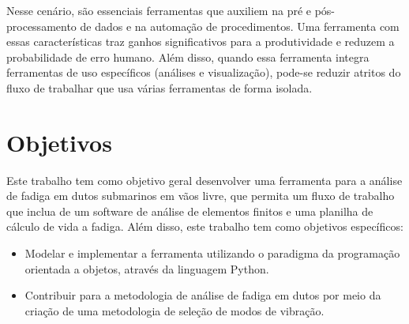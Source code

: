 Nesse cenário, são essenciais ferramentas que auxiliem na pré e pós-processamento de dados e na automação de procedimentos.
Uma ferramenta com essas características traz ganhos significativos para a produtividade e reduzem a probabilidade de erro humano.
Além disso, quando essa ferramenta integra ferramentas de uso específicos (análises e visualização), pode-se reduzir atritos do fluxo de trabalhar que usa várias ferramentas de forma isolada.

\section{Objetivos}

Este trabalho tem como objetivo geral desenvolver uma ferramenta para a análise de fadiga em dutos submarinos em vãos livre, que permita um fluxo de trabalho que inclua de um software de análise de elementos finitos e uma planilha de cálculo de vida a fadiga.
Além disso, este trabalho tem como objetivos específicos:

\begin{itemize}
    \item Modelar e implementar a ferramenta utilizando o paradigma da programação orientada a objetos, através da linguagem Python.
    \item Contribuir para a metodologia de análise de fadiga em dutos por meio da criação de uma metodologia de seleção de modos de vibração.
\end{itemize}